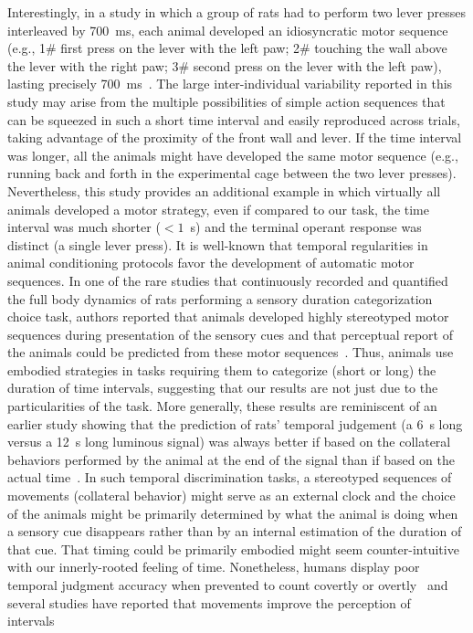 Interestingly, in a study in which a group of rats had to perform two lever presses interleaved by 700~ms, each animal developed an idiosyncratic motor sequence (e.g., 1\# first press on the lever with the left paw; 2\# touching the wall above the lever with the right paw; 3\# second press on the lever with the left paw), lasting precisely 700~ms~\cite{Kawai2015}.
The large inter-individual variability reported in this study may arise from the multiple possibilities of simple action sequences that can be squeezed in such a short time interval and easily reproduced across trials, taking advantage of the proximity of the front wall and lever.
If the time interval was longer, all the animals might have developed the same motor sequence (e.g., running back and forth in the experimental cage between the two lever presses).
Nevertheless, this study provides an additional example in which virtually all animals developed a motor strategy, even if compared to our task, the time interval was much shorter ($< 1$~s) and the terminal operant response was distinct (a single lever press).
It is well-known that temporal regularities in animal conditioning protocols favor the development of automatic motor sequences.
In one of the rare studies that continuously recorded and quantified the full body dynamics of rats performing a sensory duration categorization choice task, authors reported that animals developed highly stereotyped motor sequences during presentation of the sensory cues and that perceptual report of the animals could be predicted from these motor sequences~\cite{Gouvea2014}.
Thus, animals use embodied strategies in tasks requiring them to categorize (short or long) the duration of time intervals, suggesting that our results are not just due to the particularities of the task.
More generally, these results are reminiscent of an earlier study showing that the prediction of rats' temporal judgement (a 6~s long versus a 12~s long luminous signal) was always better if based on the collateral behaviors performed by the animal at the end of the signal than if based on the actual time~\cite{Fetterman1998BehProc}.
In such temporal discrimination tasks, a stereotyped sequences of movements (collateral behavior) might serve as an external clock and the choice of the animals might be primarily determined by what the animal is doing when a sensory cue disappears rather than by an internal estimation of the duration of that cue.
That timing could be primarily embodied might seem counter-intuitive with our innerly-rooted feeling of time.
Nonetheless, humans display poor temporal judgment accuracy when prevented to count covertly or overtly~\cite{Rattat2012} and several studies have reported that movements improve the perception of intervals~\cite{Su2012,Manning2013,Wiener2019eNeuro}
